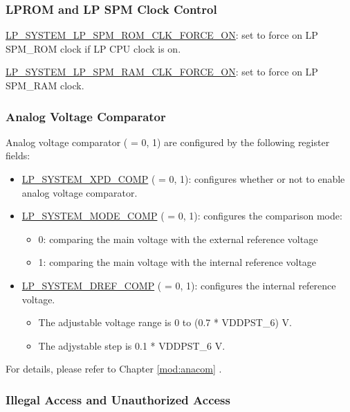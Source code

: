 \documentclass[main\_\_EN.tex]{subfiles}
\begin{document}
\subsubsection{LPROM and LP SPM Clock Control}

\hyperref[fielddesc:LPSYSTEMLPSPMROMCLKFORCEON]{LP\_SYSTEM\_LP\_SPM\_ROM\_CLK\_FORCE\_ON}: set to force on LP SPM\_ROM clock if LP CPU clock is on.

\hyperref[fielddesc:LPSYSTEMLPSPMRAMCLKFORCEON]{LP\_SYSTEM\_LP\_SPM\_RAM\_CLK\_FORCE\_ON}: set to force on LP SPM\_RAM clock.

\subsubsection{Analog Voltage Comparator}

Analog voltage comparator ( = 0, 1) are configured by the following register fields:
\begin{itemize}
    \item \hyperref[fielddesc:LPSYSTEMXPDCOMP0]{LP\_SYSTEM\_XPD\_COMP} ( = 0, 1): configures whether or not to enable analog voltage comparator.
    \item \hyperref[fielddesc:LPSYSTEMMODECOMP0]{LP\_SYSTEM\_MODE\_COMP} ( = 0, 1): configures the comparison mode:
    \begin{itemize}
        \item 0: comparing the main voltage with the external reference voltage
        \item 1: comparing the main voltage with the internal reference voltage\\
    \end{itemize}
    \item \hyperref[fielddesc:LPSYSTEMDREFCOMP0]{LP\_SYSTEM\_DREF\_COMP} ( = 0, 1): configures the internal reference voltage.
    \begin{itemize}
        \item The adjustable voltage range is 0 to (0.7 * VDDPST\_6) V.
        \item The adjystable step is 0.1 * VDDPST\_6 V.
    \end{itemize}
\end{itemize}

For details, please refer to Chapter \ref{mod:anacom} \textit{}.

\subsubsection{Illegal Access and Unauthorized Access}
\end{document}
